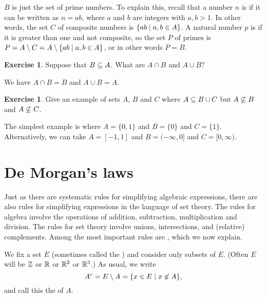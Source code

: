 \documentclass[a4paper]{book}
\theoremstyle{definition}
\newtheorem{exercise}[theorem]{Exercise}
\renewenvironment{solution}{\SolutionInline}{\endSolutionInline}
\begin{document}
\begin{solution}
 $B$ is just the set of prime numbers.  To explain this, recall that a
 number $n$ is  if it can be written as $n=ab$, where
 $a$ and $b$ are integers with $a,b>1$.  In other words, the set $C$
 of composite numbers is $\{ab\;|\; a,b\in A\}$.  A natural number $p$
 is  if it is greater than one and not composite, so the
 set $P$ of primes is $P=A\setminus C=A\setminus\{ab\;|\; a,b\in A\}$, or in other
 words $P=B$.
\end{solution}
\begin{exercise}
 Suppose that $B\subseteq A$.  What are $A\cap B$ and $A\cup B$?
\end{exercise}
\begin{solution}
 We have $A\cap B=B$ and $A\cup B=A$.  
\end{solution}
\begin{exercise}
 Give an example of sets $A$, $B$ and $C$ where $A\subseteq B\cup C$ but
 $A\not\subseteq B$ and $A\not\subseteq C$.
\end{exercise}
\begin{solution}
 The simplest example is where $A=\{0,1\}$ and $B=\{0\}$ and
 $C=\{1\}$.  Alternatively, we can take $A=[-1,1]$ and $B=(-\infty,0]$
 and $C=[0,\infty)$.
\end{solution}

\section{De Morgan's laws}
\label{sec-de-morgan}

Just as there are systematic rules for simplifying algebraic
expressions, there are also rules for simplifying expressions in the
language of set theory.  The rules for algebra involve the operations
of addition, subtraction, multiplication and division.  The rules for
set theory involve unions, intersections, and (relative) complements.
Among the most important rules are , which we
now explain.

We fix a set $E$ (sometimes called the ) and
consider only subsets of $E$.  (Often $E$ will be ${\mathbb{Z}}$ or ${\mathbb{R}}$ or
${\mathbb{R}}^2$ or ${\mathbb{R}}^3$.)  As usual, we write 
\[ A^c = E\setminus A = \{x\in E\;|\; x\not\in A\}, \]
and call this the  of $A$.
\end{document}
